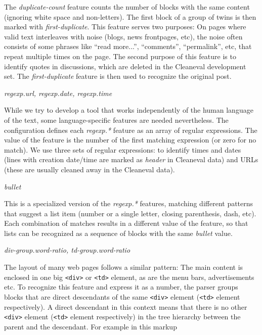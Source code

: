 \documentclass[12pt,a4paper, fleqn, leqno, twoside]{article}
\begin{document}
\begin{description}
The {\it duplicate-count} feature counts the number of blocks with the same content
(ignoring white space and non-letters). The first block of a group of
twins is then marked with {\it first-duplicate}. This feature serves two
purposes: On pages where valid text interleaves with noise (blogs, news
frontpages, etc), the noise often consists of some phrases like ``read
more...'', ``comments'', ``permalink'', etc, that repeat multiple times
on the page. The second purpose of this feature is to identify quotes in
discussions, which are deleted in the Cleaneval development set. The
{\it first-duplicate} feature is then used to recognize the original post.

\item{\it regexp.url, regexp.date, regexp.time}

While we try to develop a tool that works independently of the human
language of the text, some language-specific features are needed
nevertheless. The configuration defines each {\it regexp.*} feature as
an array of regular expressions. The value of the feature is the number
of the first matching expression (or zero for no match).  We use three
sets of regular expressions: to identify times and dates (lines with
creation date/time are marked as {\it header} in Cleaneval data) and URLs (these
are usually cleaned away in the Cleaneval data).

\item{\it bullet}

This is a specialized version of the {\it regexp.* } features, matching different
patterns that suggest a list item (number or a single letter, closing
parenthesis, dash, etc). Each combination of matches results in a
different value of the feature, so that lists can be recognized as a
sequence of blocks with the same {\it bullet} value.

\item{\label{td-group}\it div-group.word-ratio, td-group.word-ratio}

The layout of many web pages follows a similar pattern: The main content
is enclosed in one big {\tt <div>} or {\tt <td>} element, as are the
menu bars, advertisements etc. To recognize this feature and express it
as a number, the parser groups blocks that are direct descendants of the
same {\tt <div>} element ({\tt <td>} element respectively). A direct
descendant in this context means that there is no other {\tt <div>}
element ({\tt <td>} element respectively) in the tree hierarchy between
the parent and the descendant. For example in this markup


\end{description}
\end{document}
